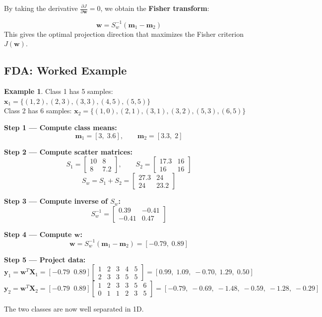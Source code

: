 \documentclass[11pt,a4paper]{article}
\theoremstyle{definition}
\newtheorem{example}{Example}[section]
\theoremstyle{plain}
\theoremstyle{remark}
\begin{document}
By taking the derivative $\frac{\partial J}{\partial \mathbf{w}} = 0$, we obtain the \textbf{Fisher transform}:

\begin{tcolorbox}[colback=yellow!10!white,colframe=orange!75!black,title=\textbf{Fisher Transform}]
\[
\mathbf{w} = S_w^{-1}(\mathbf{m}_1 - \mathbf{m}_2)
\]
This gives the optimal projection direction that maximizes the Fisher criterion $J(\mathbf{w})$.
\end{tcolorbox}

\subsection{FDA: Worked Example}

\begin{example}
Class 1 has 5 samples: $\mathbf{x}_1 = \{(1,2),(2,3),(3,3),(4,5),(5,5)\}$\\
Class 2 has 6 samples: $\mathbf{x}_2 = \{(1,0),(2,1),(3,1),(3,2),(5,3),(6,5)\}$

\textbf{Step 1 --- Compute class means:}
\[
\mathbf{m}_1 = [3, \; 3.6], \qquad \mathbf{m}_2 = [3.3, \; 2]
\]

\textbf{Step 2 --- Compute scatter matrices:}
\[
S_1 = \begin{bmatrix} 10 & 8 \\ 8 & 7.2 \end{bmatrix}, \qquad S_2 = \begin{bmatrix} 17.3 & 16 \\ 16 & 16 \end{bmatrix}
\]
\[
S_w = S_1 + S_2 = \begin{bmatrix} 27.3 & 24 \\ 24 & 23.2 \end{bmatrix}
\]

\textbf{Step 3 --- Compute inverse of $S_w$:}
\[
S_w^{-1} = \begin{bmatrix} 0.39 & -0.41 \\ -0.41 & 0.47 \end{bmatrix}
\]

\textbf{Step 4 --- Compute $\mathbf{w}$:}
\[
\mathbf{w} = S_w^{-1}(\mathbf{m}_1 - \mathbf{m}_2) = [-0.79, \; 0.89]
\]

\textbf{Step 5 --- Project data:}
\[
\mathbf{y}_1 = \mathbf{w}^T \mathbf{X}_1 = [-0.79 \;\; 0.89] \begin{bmatrix} 1 & 2 & 3 & 4 & 5 \\ 2 & 3 & 3 & 5 & 5 \end{bmatrix} = [0.99, \; 1.09, \; -0.70, \; 1.29, \; 0.50]
\]
\[
\mathbf{y}_2 = \mathbf{w}^T \mathbf{X}_2 = [-0.79 \;\; 0.89] \begin{bmatrix} 1 & 2 & 3 & 3 & 5 & 6 \\ 0 & 1 & 1 & 2 & 3 & 5 \end{bmatrix} = [-0.79, \; -0.69, \; -1.48, \; -0.59, \; -1.28, \; -0.29]
\]

The two classes are now well separated in 1D.
\end{example}
\end{document}
